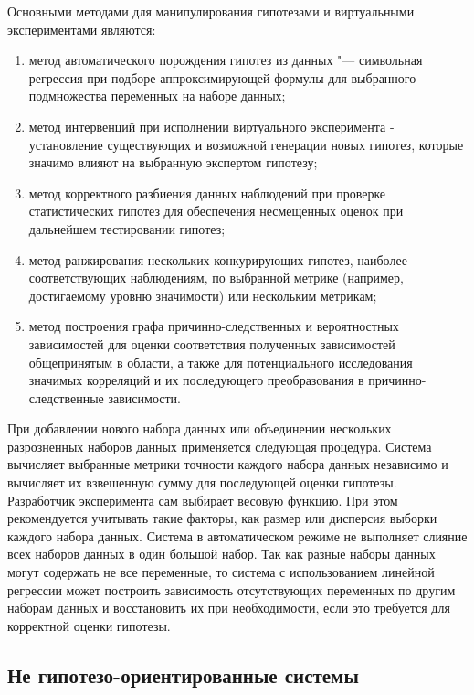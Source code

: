 Основными методами для манипулирования гипотезами и виртуальными экспериментами являются:
\begin{enumerate}
    \item метод автоматического порождения гипотез из данных "--- символьная регрессия при подборе аппроксимирующей формулы для выбранного подмножества переменных на наборе данных;
    \item метод интервенций при исполнении виртуального эксперимента - установление существующих и возможной генерации новых гипотез, которые значимо влияют на выбранную экспертом гипотезу;
    \item метод корректного разбиения данных наблюдений при проверке статистических гипотез для обеспечения несмещенных оценок при дальнейшем тестировании гипотез;
    \item метод ранжирования нескольких конкурирующих гипотез, наиболее соответствующих наблюдениям, по выбранной метрике (например, достигаемому уровню значимости) или нескольким метрикам;
    \item метод построения графа причинно-следственных и вероятностных зависимостей для оценки соответствия полученных зависимостей общепринятым в области, а также для потенциального исследования значимых корреляций и их последующего преобразования в причинно-следственные зависимости.
\end{enumerate}

При добавлении нового набора данных или объединении нескольких разрозненных наборов данных применяется следующая 
процедура. Система вычисляет выбранные метрики точности каждого набора данных независимо и вычисляет их взвешенную 
сумму для последующей оценки гипотезы. Разработчик эксперимента сам выбирает весовую функцию. При этом рекомендуется 
учитывать такие факторы, как размер или дисперсия выборки каждого набора данных. Система в автоматическом режиме не 
выполняет слияние всех наборов данных в один большой набор. Так как разные наборы данных могут содержать не все 
переменные, то система с использованием линейной регрессии может построить зависимость отсутствующих переменных по 
другим наборам данных и восстановить их при необходимости, если это требуется для корректной оценки гипотезы.

\subsection{Не гипотезо-ориентированные системы}\label{sect1_3_5}

